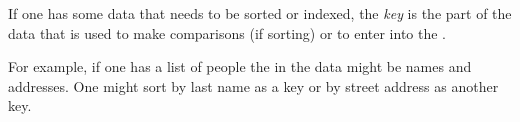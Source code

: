 \documentclass[12pt]{article}
\begin{document}
If one has some data that needs to be sorted or indexed, the \emph{key}
is the part of the data that is used to make comparisons (if sorting) or to enter
into the . 

For example, if one has a list of people the  in the data might be 
names and addresses. One might sort by last name as a key or by street address
as another key. 


\end{document}

